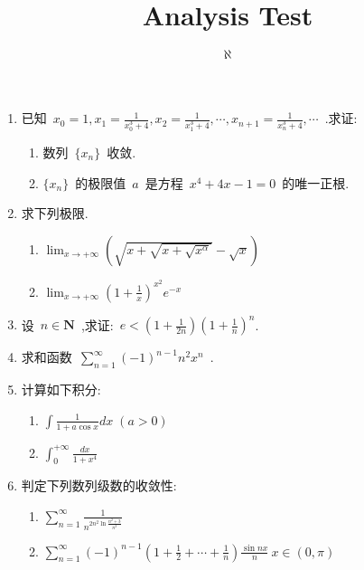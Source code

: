 \documentclass[UTF8]{article}
\title{Analysis Test}
\author{$\aleph$}
\begin{document}
	\maketitle
    \begin{enumerate}
        \item 已知~$x_0=1,x_1=\frac{1}{x_0^3+4},x_2=\frac{1}{x^3_1+4},\cdots,x_{n+1}=\frac{1}{x_n^3+4},\cdots$~.求证:
        \begin{enumerate}
            \item 数列~$\{x_n\}$~收敛.
            \item $\{x_n\}$~的极限值~$a$~是方程~$x^4+4x-1=0$~的唯一正根.
        \end{enumerate}
        \item 求下列极限.
        \begin{enumerate}
            \item $\lim_{x\to +\infty}\left(\sqrt{x+\sqrt{x+\sqrt{x^{\alpha}}}}-\sqrt{x}\right)$
            \item $\lim_{x\to +\infty}\left(1+\frac{1}{x}\right)^{x^2}\!\!e^{-x}$
        \end{enumerate}
        \item 设~$n\in \mathbf{N}$~,求证:~$e<\left(1+\frac{1}{2n}\right)\!\!\left(1+\frac{1}{n}\right)^n$.
        \item 求和函数~$\sum_{n=1}^{\infty}(-1)^{n-1}n^2x^n$~.
        \item 计算如下积分:
        \begin{enumerate}
            \item $\int\frac{1}{1+a\cos x}dx\;(a>0)$
            \item $\int_{0}^{+\infty}\frac{dx}{1+x^4}$
        \end{enumerate}
        \item 判定下列数列级数的收敛性:
        \begin{enumerate}
            \item $\sum_{n=1}^{\infty}\frac{1}{n^{2n^2\ln{\frac{n^2+3}{n^2}}}}$
            \item $\sum_{n=1}^{\infty}(-1)^{n-1}\left(1+\frac12+\cdots+\frac1n\right)\frac{\sin nx}{n}\ x\in (0,\pi)$
        \end{enumerate}
    \end{enumerate}
\end{document}
